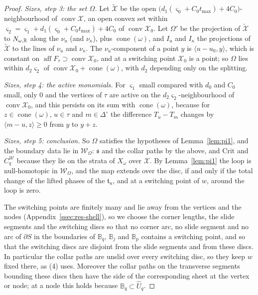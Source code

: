\begin{proof}
\emph{Sizes, step 3: the set $\Omega$.} Let $\widetilde{\mathcal X}$ be the open
$\bigl(d_1(\varsigma_0+C_0t_{\max})+4C_0\bigr)$-neighbourhood of $\operatorname{conv}\mathcal X$, an open convex set within
$\varsigma_2=\varsigma_1+d_1(\varsigma_0+C_0t_{\max})+4C_0$ of $\operatorname{conv}\mathcal X_0$. Let $\Omega'$ be the projection
of $\widetilde{\mathcal X}$ to $N_{\omega,\mathbb R}$ along the $\nu_u$ (and $\nu_\kappa$), plus $\operatorname{cone}(\omega)$, and $I_u$
and $I_\kappa$ the projections of $\widetilde{\mathcal X}$ to the lines of $\nu_u$ and $\nu_\kappa$. The $\nu_u$-component of a
point $y$ is $\langle u-u_0,y\rangle$, which is constant on $\operatorname{aff}F_\tau\supset\operatorname{conv}\mathcal X_0$, and
at a switching point $\mathcal X_0$ is a point; so $\Omega$ lies within $d_2\varsigma_2$ of
$\operatorname{conv}\mathcal X_0+\operatorname{cone}(\omega)$, with $d_2$ depending only on the splitting.

\emph{Sizes, step 4: the active monomials.} For $\varsigma_1$ small compared with $d_0$ and $C_0$ small, only $0$ and the
vertices of $\tau$ are active on the $d_2\varsigma_2$-neighbourhood of $\operatorname{conv}\mathcal X_0$, and this persists on
its sum with $\operatorname{cone}(\omega)$, because for $z\in\operatorname{cone}(\omega)$, $u\in\tau$ and $m\in\Delta^\circ$ the
difference $T_u-T_m$ changes by $\langle m-u,z\rangle\ge0$ from $y$ to $y+z$.

\emph{Sizes, step 5: conclusion.} So $\Omega$ satisfies the hypotheses of Lemma~\ref{lem:pi1}, and the boundary data lie in
$\mathscr W_\Omega$: $\mathfrak s$ and the collar paths by the above, and $\mathrm{Crit}$ and $C^{\mathscr W}_q$ because they lie on the strata of
$X_\omega$ over $\mathcal X$. By Lemma~\ref{lem:pi1} the loop is null-homotopic in $\mathscr W_\Omega$, and the map extends over the disc,
if and only if the total change of the lifted phases of the $\mathfrak t_u$, and at a switching point of $w$, around the loop is
zero.

The switching points are finitely many and lie away from the vertices and the nodes (Appendix~\ref{ssec:res-shell}), so we choose
the corner lengths, the slide segments and the switching discs so that no corner arc, no slide segment and no arc of
$\partial S$ in the boundaries of $\mathbb B_q$, $\mathbb B_j$ and $\mathbb B_p$ contains a switching point, and so that the
switching discs are disjoint from the slide segments and from these discs. In particular the collar paths are unslid over every
switching disc, so they keep $w$ fixed there, as (4) uses. Moreover the collar paths on the transverse segments bounding these
discs then have the side of the corresponding sheet at the vertex or node; at a node this holds because
$\mathbb B_q\subset\widehat U_q$.


\end{proof}
